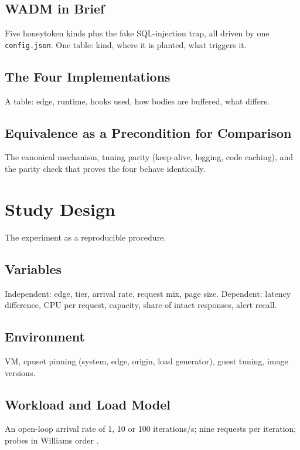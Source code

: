 \documentclass{rptuma}
\begin{document}
\section{WADM in Brief}
Five honeytoken kinds plus the fake SQL-injection trap, all driven by one \texttt{config.json}. One
table: kind, where it is planted, what triggers it.

\section{The Four Implementations}
A table: edge, runtime, hooks used, how bodies are buffered, what differs.

\section{Equivalence as a Precondition for Comparison}
The canonical mechanism, tuning parity (keep-alive, logging, code caching), and the parity check
that proves the four behave identically.

\chapter{Study Design}
\label{chap:B.design}
The experiment as a reproducible procedure.

\section{Variables}
Independent: edge, tier, arrival rate, request mix, page size. Dependent: latency difference, CPU
per request, capacity, share of intact responses, alert recall.

\section{Environment}
VM, cpuset pinning (system, edge, origin, load generator), guest tuning, image versions.

\section{Workload and Load Model}
An open-loop arrival rate of 1, 10 or 100 iterations/s; nine requests per iteration; probes in
Williams order \cite{williams1949designs}.
\end{document}
